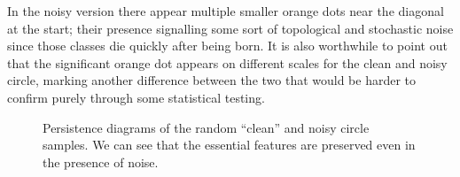 In the noisy version there appear multiple smaller orange dots near the diagonal at the start; their presence signalling some sort of topological and stochastic noise since those classes die quickly after being born. It is also worthwhile to point out that the significant orange dot appears on different scales for the clean and noisy circle, marking another difference between the two that would be harder to confirm purely through some statistical testing.

\begin{figure}
    \centering
    \qquad
    \caption{Persistence diagrams of the random ``clean'' and noisy circle samples. We can see that the essential features are preserved even in the presence of noise.}
    \label{fig:clean_noisy_homologies}
\end{figure}
